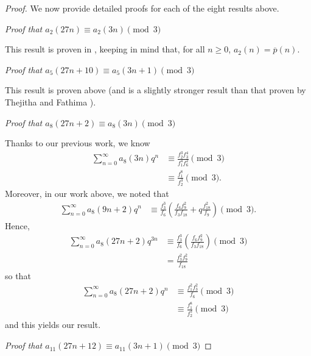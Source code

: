 \documentclass[10pt, reqno]{amsart}
\theoremstyle{theorem}
\theoremstyle{definition}
\theoremstyle{example}
\begin{document}
\begin{proof}
We now provide detailed proofs for each of the eight results above.  

\bigskip  

\noindent
{\it Proof that $a_{2}(27n) \equiv a_{2}(3n) \pmod{3}$}

\bigskip 

\noindent 
This result is proven in \cite{HS2005}, keeping in mind that, for all $n\geq 0$, $a_2(n) = \overline{p}(n)$.  

\bigskip  

\noindent
{\it Proof that $a_{5}(27n+10) \equiv a_{5}(3n+1) \pmod{3}$}

\bigskip 

\noindent 
This result is proven above (and is a slightly stronger result than that proven by Thejitha and Fathima \cite{TF}).  

\bigskip  

\noindent
{\it Proof that $a_{8}(27n+2) \equiv a_{8}(3n) \pmod{3}$}

\bigskip 

\noindent 
Thanks to our previous work, we know 
\begin{align*}
\sum_{n=0}^\infty a_8(3n)q^{n} 
&\equiv 
\frac{f_2^3f_3^4}{f_1^4f_{6}^2} \pmod{3} \\
&\equiv 
\frac{f_1^8}{f_2^3} \pmod{3}.
\end{align*}
Moreover, in our work above, we noted that 
\begin{align*}
\sum_{n=0}^\infty a_8(9n+2)q^{n} 
&\equiv 
\frac{f_3^3}{f_6}\left( \frac{f_6f_9^2}{f_3f_{18}} +q\frac{f_{18}^2}{f_9} \right) \pmod{3}.
\end{align*}
Hence, 
\begin{align*}
\sum_{n=0}^\infty a_8(27n+2)q^{3n} 
&\equiv 
\frac{f_3^3}{f_6}\left( \frac{f_6f_9^2}{f_3f_{18}} \right) \pmod{3} \\
&= 
\frac{f_3^2f_9^2}{f_{18}} 
\end{align*}
so that 
\begin{align*}
\sum_{n=0}^\infty a_8(27n+2)q^{n} 
&\equiv 
\frac{f_1^2f_3^2}{f_{6}} \pmod{3} \\
&\equiv 
\frac{f_1^8}{f_{2}^3} \pmod{3} 
\end{align*}
and this yields our result.  

\bigskip  

\noindent
{\it Proof that $a_{11}(27n+12) \equiv a_{11}(3n+1) \pmod{3}$}

\bigskip 


\end{proof}
\end{document}
